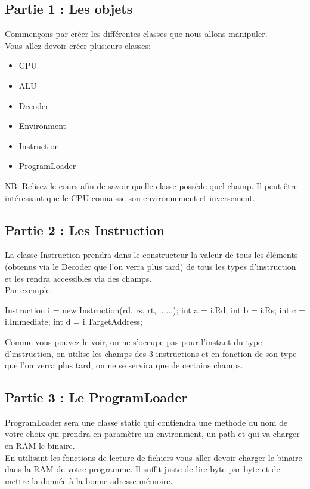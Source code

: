 \subsection{Partie 1 : Les objets}
Commençons par créer les différentes classes que nous allons manipuler.\\
Vous allez devoir créer plusieurs classes:
\begin{itemize}
\item CPU
\item ALU
\item Decoder
\item Environment
\item Instruction
\item ProgramLoader
\end{itemize}
NB: Relisez le cours afin de savoir quelle classe possède quel champ. Il peut être intéressant que le CPU connaisse son environnement et inversement.

\subsection{Partie 2 : Les Instruction}
La classe Instruction prendra dans le constructeur la valeur de tous les éléments (obtenus via le Decoder que l'on verra plus tard) de tous les types d'instruction et les rendra accessibles via des champs.\\
Par exemple:
\begin{code}
Instruction i = new Instruction(rd, rs, rt, ......);
int a = i.Rd;
int b = i.Rs;
int c = i.Immediate;
int d = i.TargetAddress;
\end{code}
Comme vous pouvez le voir, on ne s'occupe pas pour l'instant du type d'instruction, on utilise les champs des 3 instructions et en fonction de son type que l'on verra plus tard, on ne se servira que de certains champs.

\subsection{Partie 3 : Le ProgramLoader}
ProgramLoader sera une classe static qui contiendra une methode du nom de votre choix qui prendra en paramètre un environment, un path et qui va charger en RAM le binaire.\\

En utilisant les fonctions de lecture de fichiers vous aller devoir charger le binaire dans la RAM de votre programme. Il suffit juste de lire byte par byte et de mettre la donnée à la bonne adresse mémoire.

